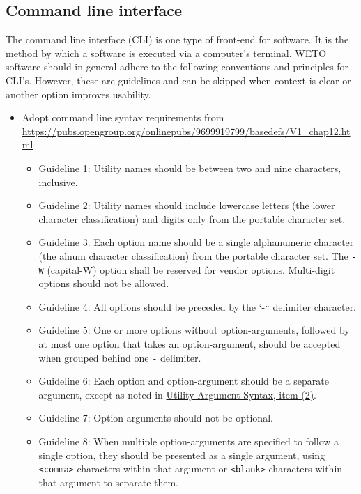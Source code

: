 \documentclass[]{nrel}
\begin{document}
\subsection{Command line interface}
The command line interface (CLI) is one type of front-end for software.
It is the method by which a software is executed via a computer’s terminal.
WETO software should in general adhere to the following conventions and principles for CLI’s.
However, these are guidelines and can be skipped when context is clear or another
option improves usability.
\begin{itemize}
\item Adopt command line syntax requirements from \url{https://pubs.opengroup.org/onlinepubs/9699919799/basedefs/V1\_chap12.html}
\begin{itemize}
\item Guideline 1: Utility names should be between two and nine characters, inclusive.

\item Guideline 2: Utility names should include lowercase letters (the lower character classification) and digits only from the portable character set.

\item Guideline 3: Each option name should be a single alphanumeric character (the alnum character classification) from the portable character set. The \lstinline{-W} (capital-W) option shall be reserved for vendor options. Multi-digit options should not be allowed.

\item Guideline 4: All options should be preceded by the `-`` delimiter character.

\item Guideline 5: One or more options without option-arguments, followed by at most one option that takes an option-argument, should be accepted when grouped behind one \lstinline{-} delimiter.

\item Guideline 6: Each option and option-argument should be a separate argument, except as noted in \href{https://pubs.opengroup.org/onlinepubs/9699919799/basedefs/V1\_chap12.html}{Utility Argument Syntax, item (2)}.

\item Guideline 7: Option-arguments should not be optional.

\item Guideline 8: When multiple option-arguments are specified to follow a single option, they should be presented as a single argument, using \lstinline{<comma>} characters within that argument or \lstinline{<blank>} characters within that argument to separate them.


\end{itemize}
\end{itemize}
\end{document}
